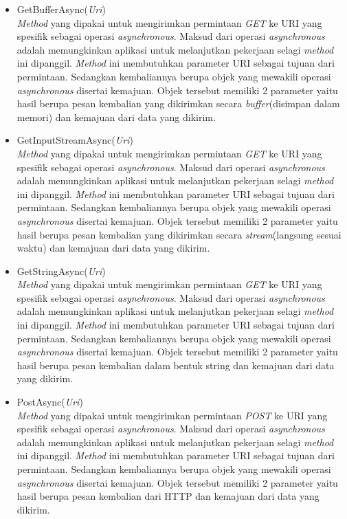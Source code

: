 \begin{itemize}
	\item GetBufferAsync(\textit{Uri}) \\
	\textit{Method} yang dipakai untuk mengirimkan permintaan \textit{GET} ke URI yang spesifik sebagai operasi \textit{asynchronous}. Maksud dari operasi \textit{asynchronous} adalah memungkinkan aplikasi untuk melanjutkan pekerjaan selagi \textit{method} ini dipanggil\footnotemark[2]. \textit{Method} ini membutuhkan parameter URI sebagai tujuan dari permintaan. Sedangkan kembaliannya berupa objek yang mewakili operasi \textit{asynchronous} disertai kemajuan. Objek tersebut memiliki 2 parameter yaitu hasil berupa pesan kembalian yang dikirimkan secara \textit{buffer}(disimpan dalam memori) dan kemajuan dari data yang dikirim.
	\item GetInputStreamAsync(\textit{Uri}) \\
	\textit{Method} yang dipakai untuk mengirimkan permintaan \textit{GET} ke URI yang spesifik sebagai operasi \textit{asynchronous}. Maksud dari operasi \textit{asynchronous} adalah memungkinkan aplikasi untuk melanjutkan pekerjaan selagi \textit{method} ini dipanggil\footnotemark[2]. \textit{Method} ini membutuhkan parameter URI sebagai tujuan dari permintaan. Sedangkan kembaliannya berupa objek yang mewakili operasi \textit{asynchronous} disertai kemajuan. Objek tersebut memiliki 2 parameter yaitu hasil berupa pesan kembalian yang dikirimkan secara \textit{stream}(langsung sesuai waktu) dan kemajuan dari data yang dikirim.
	\item GetStringAsync(\textit{Uri}) \\
	\textit{Method} yang dipakai untuk mengirimkan permintaan \textit{GET} ke URI yang spesifik sebagai operasi \textit{asynchronous}. Maksud dari operasi \textit{asynchronous} adalah memungkinkan aplikasi untuk melanjutkan pekerjaan selagi \textit{method} ini dipanggil\footnotemark[2]. \textit{Method} ini membutuhkan parameter URI sebagai tujuan dari permintaan. Sedangkan kembaliannya berupa objek yang mewakili operasi \textit{asynchronous} disertai kemajuan. Objek tersebut memiliki 2 parameter yaitu hasil berupa pesan kembalian dalam bentuk string dan kemajuan dari data yang dikirim.
	\item PostAsync(\textit{Uri}) \\
	\textit{Method} yang dipakai untuk mengirimkan permintaan \textit{POST} ke URI yang spesifik sebagai operasi \textit{asynchronous}. Maksud dari operasi \textit{asynchronous} adalah memungkinkan aplikasi untuk melanjutkan pekerjaan selagi \textit{method} ini dipanggil\footnotemark[2]. \textit{Method} ini membutuhkan parameter URI sebagai tujuan dari permintaan. Sedangkan kembaliannya berupa objek yang mewakili operasi \textit{asynchronous} disertai kemajuan. Objek tersebut memiliki 2 parameter yaitu hasil berupa pesan kembalian dari HTTP dan kemajuan dari data yang dikirim.

\end{itemize}

